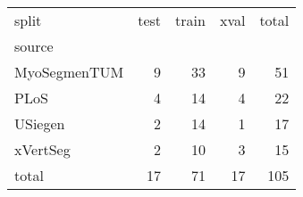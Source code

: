 \begin{tabular}{lrrr|r}
\toprule
split &  test &  train &  xval  & total\\
source       &       &        &   &    \\
\midrule
MyoSegmenTUM &     9 &     33 &     9 & 51 \\
PLoS         &     4 &     14 &     4 & 22 \\
USiegen      &     2 &     14 &     1 & 17\\
xVertSeg     &     2 &     10 &     3 & 15\\
\midrule
total & 17 & 71 & 17 & 105 \\
\bottomrule
\end{tabular}
